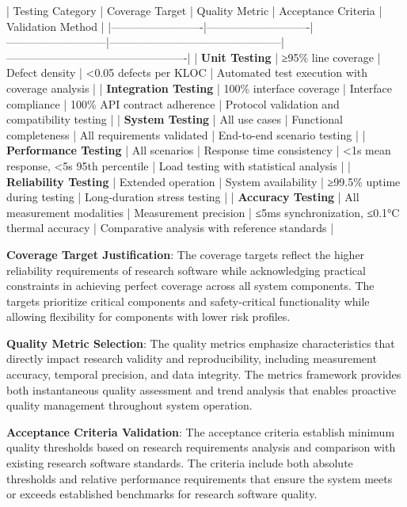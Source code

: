 \documentclass[12pt,a4paper]{report}
\begin{document}
| Testing Category        | Coverage Target            | Quality Metric            | Acceptance Criteria                           | Validation Method                               |
|-------------------------|----------------------------|---------------------------|-----------------------------------------------|-------------------------------------------------|
| \textbf{Unit Testing}        | ≥95\% line coverage         | Defect density            | <0.05 defects per KLOC                        | Automated test execution with coverage analysis |
| \textbf{Integration Testing} | 100\% interface coverage    | Interface compliance      | 100\% API contract adherence                   | Protocol validation and compatibility testing   |
| \textbf{System Testing}      | All use cases              | Functional completeness   | All requirements validated                    | End-to-end scenario testing                     |
| \textbf{Performance Testing} | All scenarios              | Response time consistency | <1s mean response, <5s 95th percentile        | Load testing with statistical analysis          |
| \textbf{Reliability Testing} | Extended operation         | System availability       | ≥99.5\% uptime during testing                  | Long-duration stress testing                    |
| \textbf{Accuracy Testing}    | All measurement modalities | Measurement precision     | ≤5ms synchronization, ≤0.1°C thermal accuracy | Comparative analysis with reference standards   |

\textbf{Coverage Target Justification}: The coverage targets reflect the higher reliability requirements of research software
while acknowledging practical constraints in achieving perfect coverage across all system components. The targets
prioritize critical components and safety-critical functionality while allowing flexibility for components with lower
risk profiles.

\textbf{Quality Metric Selection}: The quality metrics emphasize characteristics that directly impact research validity and
reproducibility, including measurement accuracy, temporal precision, and data integrity. The metrics framework provides
both instantaneous quality assessment and trend analysis that enables proactive quality management throughout system
operation.

\textbf{Acceptance Criteria Validation}: The acceptance criteria establish minimum quality thresholds based on research
requirements analysis and comparison with existing research software standards. The criteria include both absolute
thresholds and relative performance requirements that ensure the system meets or exceeds established benchmarks for
research software quality.
\end{document}
